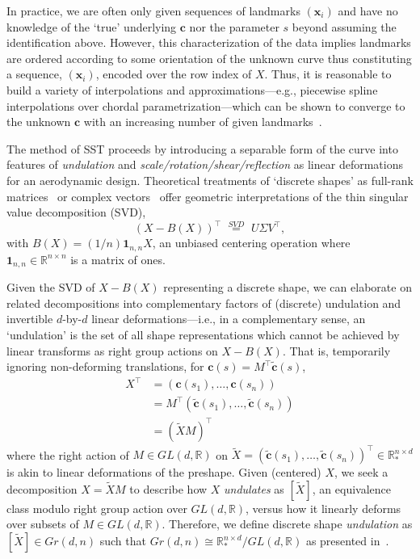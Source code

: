 \documentclass[pdflatex,iicol]{sn-jnl}%
\theoremstyle{thmstyleone}%
\theoremstyle{thmstyletwo}%
\theoremstyle{thmstylethree}%
\begin{document}
In practice, we are often only given sequences of landmarks $(\boldsymbol{x}_i)$ and have no knowledge of the `true' underlying $\boldsymbol{c}$ nor the parameter $s$ beyond assuming the identification above. However, this characterization of the data implies landmarks are ordered according to some orientation of the unknown curve thus constituting a sequence, $(\boldsymbol{x}_i)$, encoded over the row index of $X$. Thus, it is reasonable to build a variety of interpolations and approximations---e.g., piecewise spline interpolations over chordal parametrization---which can be shown to converge to the unknown $\boldsymbol{c}$ with an increasing number of given landmarks~\cite{grey2023separable, floater2005arc}.

The method of SST proceeds by introducing a separable form of the curve into features of \emph{undulation} and \emph{scale/rotation/shear/reflection} as linear deformations for an aerodynamic design. Theoretical treatments of `discrete shapes' as full-rank matrices~\cite{bryner20142d} or complex vectors~\cite{kendall2009shape} offer geometric interpretations of the thin singular value decomposition (SVD),
\begin{equation} \label{eq:landmark_stnd}
    (X - B(X))^{\top} \,\,\overset{SVD}{=}\,\, U\Sigma V^{\top},
\end{equation}
with $B(X) = (1/n)\boldsymbol{1}_{n,n}X$, an unbiased centering operation where $\boldsymbol{1}_{n,n}\in \mathbb{R}^{n\times n}$ is a matrix of ones. 

Given the SVD of $X- B(X)$ representing a discrete shape, we can elaborate on related decompositions into complementary factors of (discrete) undulation and invertible $d$-by-$d$ linear deformations---i.e., in a complementary sense, an `undulation' is the set of all shape representations which cannot be achieved by linear transforms as right group actions on $X - B(X)$. That is, temporarily ignoring non-deforming translations, for $\boldsymbol{c}(s) = M^{\top}\widetilde{\boldsymbol{c}}(s)$,
\begin{align} \label{eq:linear_deforms}
    X^{\top} &= (\boldsymbol{c}(s_1),\dots,\boldsymbol{c}(s_n))\\ \nonumber
    &= M^{\top}(\widetilde{\boldsymbol{c}}(s_1),\dots,\widetilde{\boldsymbol{c}}(s_n)) \\ \nonumber
    &= (\widetilde{X}M)^{\top} \nonumber
\end{align}
where the right action of $M \in GL(d,\mathbb{R})$ on $\widetilde{X} = (\widetilde{\boldsymbol{c}}(s_1),\dots,\widetilde{\boldsymbol{c}}(s_n))^{\top}\in \mathbb{R}^{n \times d}_*$ is akin to linear deformations of the preshape. Given (centered) $X$, we seek a decomposition $X = \widetilde{X}M$ to describe how $X$ \textit{undulates} as $[\widetilde{X}]$, an equivalence class modulo right group action over $GL(d,\mathbb{R})$, versus how it linearly deforms over subsets of $M \in GL(d,\mathbb{R})$. Therefore, we define discrete shape \textit{undulation} as $[\widetilde{X}] \in Gr(d,n)$ such that $Gr(d,n) \cong \mathbb{R}^{n \times d}_*/GL(d,\mathbb{R})$ as presented in~\cite{absil2008optimization}. 
\end{document}
